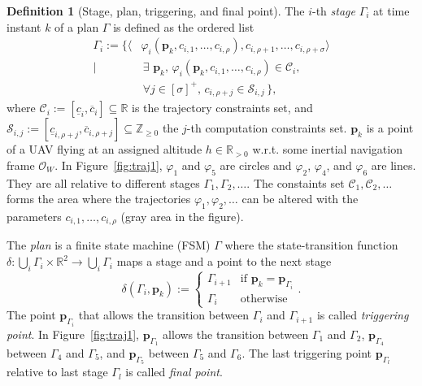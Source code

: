 \documentclass[letterpaper,10pt,conference]{ieeeconf}
\theoremstyle{definition}
\newtheorem{defn}{Definition}[section]
\begin{document}
\begin{defn}[Stage, plan, triggering, and final point]\label{def:mission}
  The $i$-th \emph{stage} $\Gamma_i$ at time instant $k$ of a plan $\Gamma$ is defined as the ordered list
  \begin{equation}\label{eq:mission}\begin{split}
    \Gamma_i:=\{\langle&\varphi_i(\mathbf{p}_k,c_{i,1},\dots,c_{i,\rho}),c_{i,\rho+1},\dots,c_{i,\rho+\sigma}\rangle\\\mid
    &\,\exists\,\,\mathbf{p}_k,\,\varphi_i(\mathbf{p}_k,c_{i,1},\dots,c_{i,\rho})\in\mathcal{C}_i,\,\\
      &\,\forall j\in[\sigma]^+,\,c_{i,\rho+j}\in\mathcal{S}_{i,j}\,\},
  \end{split}\end{equation}
  where $\mathcal{C}_i:=[\underline{c}_i,\overline{c}_i]\subseteq\mathbb{R}$ is the trajectory constraints set, and $\mathcal{S}_{i,j}:=[\underline{c}_{i,\rho+j},\overline{c}_{i,\rho+j}]\subseteq\mathbb{Z}_{\geq 0}$ the $j$-th computation constraints set. $\mathbf{p}_k$ is a point of a UAV flying at an assigned altitude $h\in\mathbb{R}_{>0}$ w.r.t. some inertial navigation frame $\mathcal{O}_W$. In Figure~\ref{fig:traj1}, $\varphi_1$ and $\varphi_5$ are circles and $\varphi_2$, $\varphi_4$, and $\varphi_6$ are lines. They are all relative to different stages $\Gamma_1,\Gamma_2,\dots$. The constaints set $\mathcal{C}_1,\mathcal{C}_2,\dots$ forms the area where the trajectories $\varphi_1,\varphi_2,\dots$ can be altered with the parameters $c_{i,1},\dots,c_{i,\rho}$ (gray area in the figure). 

  The \emph{plan} is a finite state machine (FSM) $\Gamma$ where the state-transition function $\delta:\bigcup_i{\Gamma_i}\times\mathbb{R}^2\rightarrow\bigcup_i{\Gamma_i}$ maps a stage and a point to the next stage
  \begin{equation*}\delta(\Gamma_i,\mathbf{p}_k):=\begin{cases}
    \Gamma_{i+1} & \text{if }\mathbf{p}_k=\mathbf{p}_{\Gamma_i}\\
    \Gamma_i & \text{otherwise}
  \end{cases}.\end{equation*}
  The point $\mathbf{p}_{\Gamma_{i}}$ that allows the transition between $\Gamma_i$ and $\Gamma_{i+1}$ is called \emph{triggering point}. In Figure~\ref{fig:traj1}, $\mathbf{p}_{\Gamma_1}$ allows the transition between $\Gamma_1$ and $\Gamma_2$, $\mathbf{p}_{\Gamma_4}$ between $\Gamma_4$ and $\Gamma_5$, and $\mathbf{p}_{\Gamma_5}$ between $\Gamma_5$ and $\Gamma_6$. The last triggering point $\mathbf{p}_{\Gamma_{l}}$ relative to last stage $\Gamma_l$ is called \emph{final point}.
\end{defn}
\end{document}
